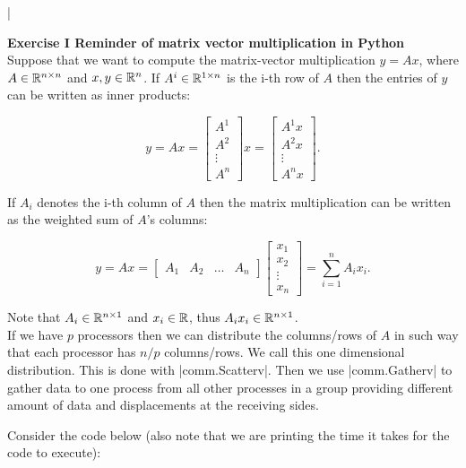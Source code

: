 \documentclass[11pt]{article}
\begin{document}
\lstset{frameround=fttt,language=Matlab}

\lstMakeShortInline[columns=fixed]|


{\bf{Exercise I Reminder of matrix vector multiplication in Python}}\\

Suppose that we want to compute the matrix-vector multiplication $y = Ax$, where $A \in \mathbb{R}^{n \times n}$ and $x, y \in \mathbb{R}^{n}$. If $A^{i} \in \mathbb{R}^{1 \times n}$ is the i-th row of $A$ then the entries of $y$ can be written as inner products:

\[y = Ax = \begin{bmatrix} A^{1} \\ A^{2} \\ \vdots \\ A^{n}  \end{bmatrix} x = \begin{bmatrix} A^{1}x \\ A^{2}x \\ \vdots \\ A^{n}x \end{bmatrix} . \]

If $A_{i}$ denotes the i-th column of $A$ then the matrix multiplication can be written as the weighted sum of $A$'s columns:

\[y = Ax = \begin{bmatrix} A_{1} & A_{2} & \hdots & A_{n}  \end{bmatrix} \begin{bmatrix} x_{1} \\ x_{2} \\ \vdots \\ x_{n}  \end{bmatrix} = \sum_{i = 1}^{n} A_i x_i. \]

Note that $A_i \in \mathbb{R}^{n \times 1}$ and $x_i \in \mathbb{R}$, thus $A_i x_i \in \mathbb{R}^{n \times 1}$. \\

If we have $p$ processors then we can distribute the columns/rows of $A$ in such way that each processor has $n/p$ columns/rows. We call this one dimensional distribution. This is done with |comm.Scatterv|. Then we use |comm.Gatherv| to gather data to one process from all other processes in a group providing different amount of data and displacements at the receiving sides. 

Consider the code below (also note that we are printing the time it takes for the code to execute):
\end{document}
